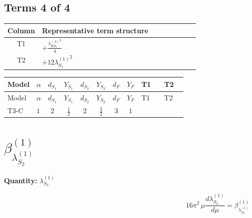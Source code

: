 \documentclass[8pt]{article}
\begin{document}
\begin{landscape}
\subsection*{Terms 4 of 4}
\begin{center}
\begin{tabular}{@{}c >{\raggedright\arraybackslash}p{0.82\linewidth}@{}}
\toprule
Column & Representative term structure \\
\midrule
T1 & \(\displaystyle +\frac{{\lambda_{HS_1}^{(A)}}^2}{4}\) \\
\midrule
T2 & \(\displaystyle +12 {\lambda_{S_1}^{(1)}}^2\) \\
\midrule
\bottomrule
\end{tabular}
\end{center}
\smallskip
\tiny
\begin{longtable}{@{}llcccccc >{\raggedright\arraybackslash}p{0.21\linewidth} >{\raggedright\arraybackslash}p{0.21\linewidth}@{}}
\toprule
Model & $\alpha$ & $d_{S_1}$ & $Y_{S_1}$ & $d_{S_2}$ & $Y_{S_2}$ & $d_F$ & $Y_F$ & T1 & T2 \\
\midrule
\endfirsthead
\toprule
Model & $\alpha$ & $d_{S_1}$ & $Y_{S_1}$ & $d_{S_2}$ & $Y_{S_2}$ & $d_F$ & $Y_F$ & T1 & T2 \\
\midrule
\endhead
T3-C & $1$ & $2$ & $\frac{1}{2}$ & $2$ & $\frac{3}{2}$ & $3$ & $1$ & \scriptsize\adjustbox{max width=\linewidth}{$\begin{gathered} +\frac{{\lambda_{HS_1}^{(A)}}^2}{4}\end{gathered}$} & \scriptsize\adjustbox{max width=\linewidth}{$\begin{gathered} +12 {\lambda_{S_1}^{(1)}}^2\end{gathered}$} \\
\midrule
\bottomrule
\end{longtable}
\clearpage
\section*{$\beta_{\lambda_{S_2}^{(1)}}^{(1)}$}
\noindent\textbf{Quantity: }$\lambda_{S_2}^{(1)}$\par\smallskip
\[16\pi^2\,\mu\frac{d \lambda_{S_2}^{(1)}}{d\mu}=\beta_{\lambda_{S_2}^{(1)}}^{(1)}\]

\end{landscape}
\end{document}
